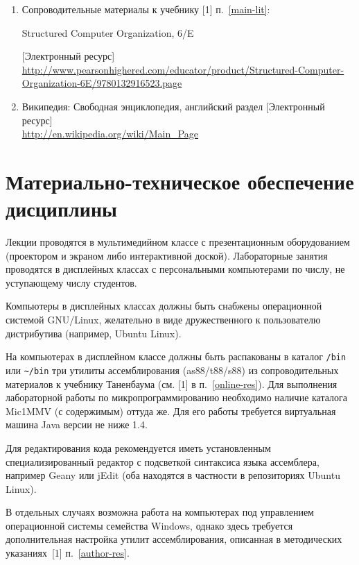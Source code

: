 	\label{online-res}
\begin{enumerate}
	\item Сопроводительные материалы к учебнику [1] п.~\ref{main-lit}:
	\begin{otherlanguage}{english}
	Structured Computer Organization, 6/E 
	\end{otherlanguage}
	[Электронный ресурс]\\
	\url{http://www.pearsonhighered.com/educator/product/Structured-Computer-Organization-6E/9780132916523.page}

	\item Википедия: Свободная энциклопедия, английский раздел [Электронный ресурс]\\
	\url{http://en.wikipedia.org/wiki/Main_Page}
\end{enumerate}

\section{Материально-техническое обеспечение дисциплины}
	
Лекции проводятся в мультимедийном классе с презентационным оборудованием (проектором и экраном либо интерактивной доской). Лабораторные занятия проводятся в дисплейных классах с персональными компьютерами по числу, не уступающему числу студентов.


Компьютеры в дисплейных классах должны быть снабжены операционной системой GNU/Linux, желательно в виде дружественного к пользователю дистрибутива (например, Ubuntu Linux).

На компьютерах в дисплейном классе должны быть распакованы в каталог \texttt{/bin} или \texttt{\textasciitilde/bin} три утилиты ассемблирования (as88/t88/s88) из сопроводительных материалов к учебнику Таненбаума (см. [1] в п.~\ref{online-res}). Для выполнения лабораторной работы по микропрограммированию необходимо наличие каталога Mic1MMV (с содержимым) оттуда же. Для его работы требуется виртуальная машина Java версии не ниже 1.4.

Для редактирования кода рекомендуется иметь установленным специализированный редактор с подсветкой синтаксиса языка ассемблера, например Geany или jEdit (оба находятся в частности в репозиториях Ubuntu Linux).

В отдельных случаях возможна работа на компьютерах под управлением операционной системы семейства Windows, однако здесь требуется дополнительная настройка утилит ассемблирования, описанная в методических указаниях~[1] п.~\ref{author-res}.


